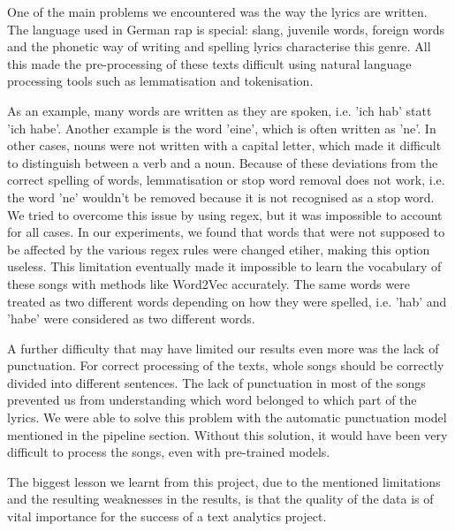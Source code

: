 One of the main problems we encountered was the way the lyrics are written. The language used in German rap is special: slang, juvenile words, foreign words and the phonetic way of writing and spelling lyrics characterise this genre. All this made the pre-processing of these texts difficult using natural language processing tools such as lemmatisation and tokenisation. 

As an example, many words are written as they are spoken, i.e. 'ich hab' statt 'ich habe'. Another example is the word 'eine', which is often written as 'ne'. In other cases, nouns were not written with a capital letter, which made it difficult to distinguish between a verb and a noun.  Because of these deviations from the correct spelling of words, lemmatisation or stop word removal does not work, i.e. the word 'ne' wouldn't be removed because it is not recognised as a stop word. We tried to overcome this issue by using regex, but it was impossible to account for all cases. In our experiments, we found that words that were not supposed to be affected by the various regex rules were changed etiher, making this option useless. This limitation eventually made it impossible to learn the vocabulary of these songs with methods like Word2Vec accurately. The same words were treated as two different words depending on how they were spelled, i.e. 'hab' and 'habe' were considered as two different words.

A further difficulty that may have limited our results even more was the lack of punctuation. For correct processing of the texts, whole songs should be correctly divided into different sentences. The lack of punctuation in most of the songs prevented us from understanding which word belonged to which part of the lyrics. We were able to solve this problem with the automatic punctuation model mentioned in the pipeline section. Without this solution, it would have been very difficult to process the songs, even with pre-trained models.

The biggest lesson we learnt from this project, due to the mentioned limitations and the resulting weaknesses in the results, is that the quality of the data is of vital importance for the success of a text analytics project. 

\newpage